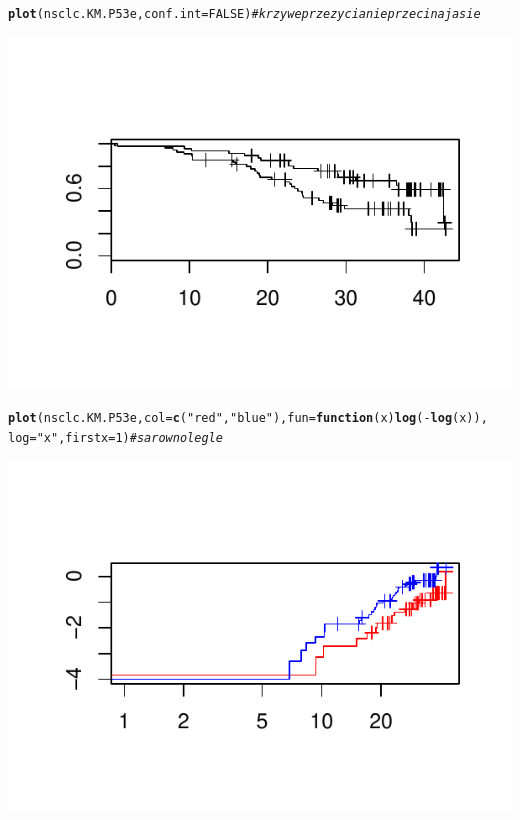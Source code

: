 \documentclass[10pt,a4paper]{article}\usepackage[]{graphicx}\usepackage[]{color}
\makeatletter
\def\maxwidth{ %
  \ifdim\Gin@nat@width>\linewidth
    \linewidth
  \else
    \Gin@nat@width
  \fi
}
\newcommand{\hlnum}[1]{\textcolor[rgb]{0.686,0.059,0.569}{#1}}%
\newcommand{\hlstr}[1]{\textcolor[rgb]{0.192,0.494,0.8}{#1}}%
\newcommand{\hlcom}[1]{\textcolor[rgb]{0.678,0.584,0.686}{\textit{#1}}}%
\newcommand{\hlopt}[1]{\textcolor[rgb]{0,0,0}{#1}}%
\newcommand{\hlstd}[1]{\textcolor[rgb]{0.345,0.345,0.345}{#1}}%
\newcommand{\hlkwa}[1]{\textcolor[rgb]{0.161,0.373,0.58}{\textbf{#1}}}%
\newcommand{\hlkwc}[1]{\textcolor[rgb]{0.333,0.667,0.333}{#1}}%
\newcommand{\hlkwd}[1]{\textcolor[rgb]{0.737,0.353,0.396}{\textbf{#1}}}%
\newenvironment{kframe}{%
 \def\at@end@of@kframe{}%
 \ifinner\ifhmode%
  \def\at@end@of@kframe{\end{minipage}}%
  \begin{minipage}{\columnwidth}%
 \fi\fi%
 \def\FrameCommand##1{\hskip\@totalleftmargin \hskip-\fboxsep
 \colorbox{shadecolor}{##1}\hskip-\fboxsep
     \hskip-\linewidth \hskip-\@totalleftmargin \hskip\columnwidth}%
 \MakeFramed {\advance\hsize-\width
   \@totalleftmargin\z@ \linewidth\hsize
   \@setminipage}}%
 {\par\unskip\endMakeFramed%
 \at@end@of@kframe}
\newenvironment{knitrout}{}{} %
\makeatother
\begin{document}
\begin{knitrout}
\begin{kframe}
\begin{alltt}
\hlkwd{plot}\hlstd{(nsclc.KM.P53e,} \hlkwc{conf.int} \hlstd{=} \hlnum{FALSE}\hlstd{)}  \hlcom{# krzywe przezycia nie przecinaja sie}
\end{alltt}
\end{kframe}

{\centering \includegraphics[width=\maxwidth]{figure/unnamed-chunk-12} 

}


\begin{kframe}\begin{alltt}
\hlkwd{plot}\hlstd{(nsclc.KM.P53e,} \hlkwc{col} \hlstd{=} \hlkwd{c}\hlstd{(}\hlstr{"red"}\hlstd{,} \hlstr{"blue"}\hlstd{),} \hlkwc{fun} \hlstd{=} \hlkwa{function}\hlstd{(}\hlkwc{x}\hlstd{)} \hlkwd{log}\hlstd{(}\hlopt{-}\hlkwd{log}\hlstd{(x)),}
    \hlkwc{log} \hlstd{=} \hlstr{"x"}\hlstd{,} \hlkwc{firstx} \hlstd{=} \hlnum{1}\hlstd{)}  \hlcom{# sa rownolegle}
\end{alltt}
\end{kframe}

{\centering \includegraphics[width=\maxwidth]{figure/unnamed-chunk-13} 

}
\end{knitrout}
\end{document}
